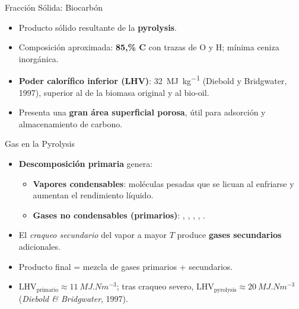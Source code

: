 \documentclass[../../main.tex]{subfiles}
\begin{document}
\begin{frame}{Fracción Sólida: Biocarbón}
\begin{itemize}
\item Producto sólido resultante de la \textbf{pyrolysis}.
\item Composición aproximada: \textbf{85,\% C} con trazas de O y H; mínima ceniza inorgánica.
\item \textbf{Poder calorífico inferior (LHV)}: \SI{32}{\mega\joule\per\kilogram} (Diebold y Bridgwater, 1997), superior al de la biomasa original y al bio‑oil.
\item Presenta una \textbf{gran área superficial porosa}, útil para adsorción y almacenamiento de carbono.
\end{itemize}
\end{frame}
\begin{frame}{Gas en la Pyrolysis}
\small
\begin{itemize}
\item \textbf{Descomposición primaria} genera:
\begin{itemize}
\item \textbf{Vapores condensables}: moléculas pesadas que se licuan al enfriarse y aumentan el rendimiento líquido.
\item \textbf{Gases no condensables (primarios)}: , , , , .
\end{itemize}
\item El \textit{craqueo secundario} del vapor a mayor $T$ produce \textbf{gases secundarios} adicionales.
\item Producto final = mezcla de gases primarios + secundarios.
\item $\text{LHV}_{\text{primario}} \approx \SI{11}{MJ.Nm^{-3}}$; tras craqueo severo, $\text{LHV}_{\text{pyrolysis}} \approx \SI{20}{MJ.Nm^{-3}}$ (\textit{Diebold \& Bridgwater}, 1997).
\end{itemize}
\end{frame}
\end{document}
